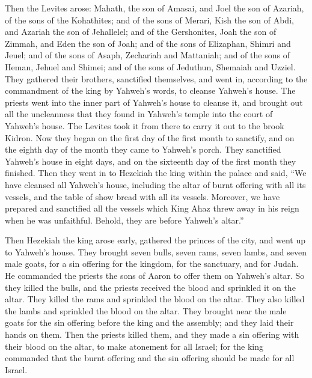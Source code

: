  Then the Levites arose: Mahath, the son of Amasai, and
Joel the son of Azariah, of the sons of the Kohathites; and of the sons
of Merari, Kish the son of Abdi, and Azariah the son of Jehallelel; and
of the Gershonites, Joah the son of Zimmah, and Eden the son of Joah;
 and of the sons of Elizaphan, Shimri and Jeuel; and of
the sons of Asaph, Zechariah and Mattaniah;  and of the
sons of Heman, Jehuel and Shimei; and of the sons of Jeduthun, Shemaiah
and Uzziel.  They gathered their brothers, sanctified
themselves, and went in, according to the commandment of the king by
Yahweh's words, to cleanse Yahweh's house.  The priests
went into the inner part of Yahweh's house to cleanse it, and brought
out all the uncleanness that they found in Yahweh's temple into the
court of Yahweh's house. The Levites took it from there to carry it out
to the brook Kidron.  Now they began on the first day of
the first month to sanctify, and on the eighth day of the month they
came to Yahweh's porch. They sanctified Yahweh's house in eight days,
and on the sixteenth day of the first month they finished.
 Then they went in to Hezekiah the king within the palace
and said, ``We have cleansed all Yahweh's house, including the altar of
burnt offering with all its vessels, and the table of show bread with
all its vessels.  Moreover, we have prepared and
sanctified all the vessels which King Ahaz threw away in his reign when
he was unfaithful. Behold, they are before Yahweh's altar.''

 Then Hezekiah the king arose early, gathered the princes
of the city, and went up to Yahweh's house.  They brought
seven bulls, seven rams, seven lambs, and seven male goats, for a sin
offering for the kingdom, for the sanctuary, and for Judah. He commanded
the priests the sons of Aaron to offer them on Yahweh's altar.
 So they killed the bulls, and the priests received the
blood and sprinkled it on the altar. They killed the rams and sprinkled
the blood on the altar. They also killed the lambs and sprinkled the
blood on the altar.  They brought near the male goats for
the sin offering before the king and the assembly; and they laid their
hands on them.  Then the priests killed them, and they
made a sin offering with their blood on the altar, to make atonement for
all Israel; for the king commanded that the burnt offering and the sin
offering should be made for all Israel.

